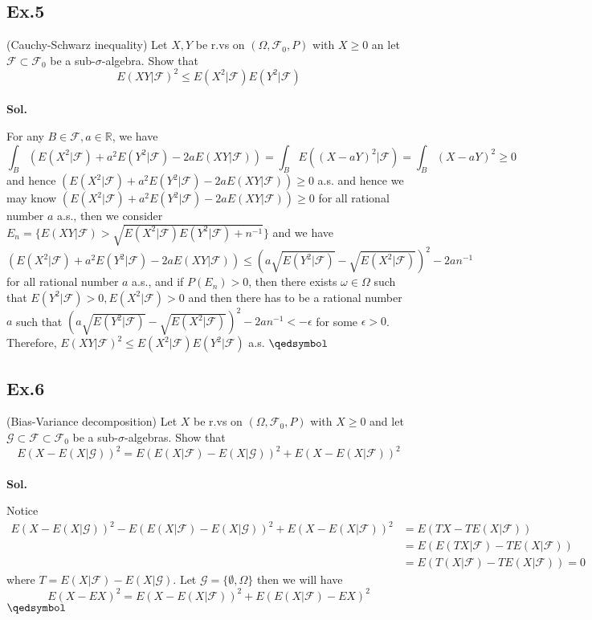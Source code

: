 \documentclass[lang=en,11pt,a4paper,citestyle =authoryear]{elegantpaper}
\newcommand{\prvd}{$\hfill \qedsymbol$}
\newcommand{\R}{\mathbb{R}}
\newcommand{\F}{\mathcal{F}}
\begin{document}
\subsection*{Ex.5} 
(Cauchy-Schwarz inequality) Let $X,Y$ be r.vs on $(\Omega,\F_0,P)$ with $X \geq 0$ an let $\F\subset \F_0$ be a sub-$\sigma$-algebra. Show that
\[
E(XY|\F)^2 \leq E(X^2|\F)E(Y^2|\F)
\]
\vspace{0.5em}\\
\textbf{Sol.} \par
For any $B\in \F, a\in \R$, we have
\[
\int_B (E(X^2|\F) + a^2E(Y^2|\F) - 2aE(XY|\F)) = \int_B E((X-aY)^2|\F)= \int_B (X-aY)^2 \geq 0
\]
and hence $(E(X^2|\F) + a^2E(Y^2|\F) - 2aE(XY|\F)) \geq 0$ a.s. and hence we may know $(E(X^2|\F) + a^2E(Y^2|\F) - 2aE(XY|\F)) \geq 0$ for all rational number $a$ a.s., then we consider $E_n = \{E(XY|\F) > \sqrt{E(X^2|\F)E(Y^2|\F)+n^{-1}}\}$ and we have
\[
(E(X^2|\F) + a^2E(Y^2|\F) - 2aE(XY|\F)) \leq (a\sqrt{E(Y^2|\F)} - \sqrt{E(X^2|\F)})^2 - 2an^{-1}
\]
for all rational number $a$ a.s., and if $P(E_n) > 0$, then there exists $\omega \in \Omega$ such that $E(Y^2|\F) > 0, E(X^2|\F) > 0$ and then there has to be a rational number $a$  such that $(a\sqrt{E(Y^2|\F)} - \sqrt{E(X^2|\F)})^2 - 2an^{-1} < -\epsilon$ for some $\epsilon > 0$. Therefore, $E(XY|\F)^2 \leq E(X^2|\F)E(Y^2|\F)$ a.s.
\prvd
\vspace{0.5em}

\subsection*{Ex.6} 
(Bias-Variance decomposition) Let $X$ be r.vs on $(\Omega,\F_0,P)$ with $X \geq 0$ and let $\mathcal{G} \subset \F\subset \F_0$ be a sub-$\sigma$-algebras. Show that
\[
E(X-E(X|\mathcal{G}))^2 = E(E(X|\F)-E(X|\mathcal{G}))^2 + E(X-E(X|\F))^2
\]
\vspace{0.5em}\\
\textbf{Sol.} \par
Notice
\[
\begin{aligned}
E(X-E(X|\mathcal{G}))^2 - E(E(X|\F)-E(X|\mathcal{G}))^2 + E(X-E(X|\F))^2 &= E(TX - TE(X|\F)) \\ &= E(E(TX|\F)-TE(X|\F)) \\ &= E(T(X|\F) - TE(X|\F)) = 0
\end{aligned}
\]
where $T = E(X|\F) - E(X|\mathcal{G})$. Let $\mathcal{G} = \{\emptyset, \Omega\}$ then we will have
\[
E(X-EX)^2 = E(X-E(X|\F))^2 + E(E(X|\F)-EX)^2
\]
\prvd
\vspace{0.5em}
\end{document}
